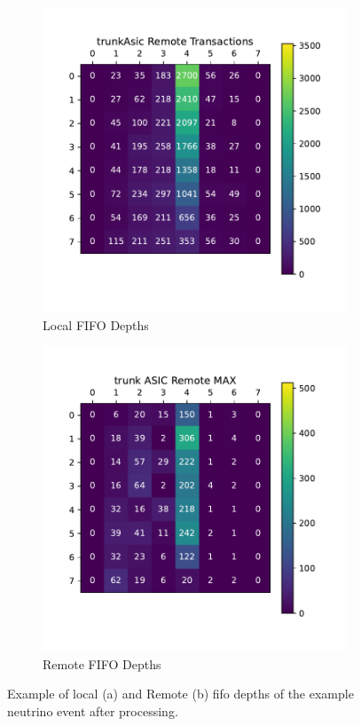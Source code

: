 \begin{figure}
\centering
\begin{subfigure}{.5\textwidth}
  \centering
  \includegraphics[width=\textwidth]{images/trunk_asic_trans.pdf}
  \caption{Local FIFO Depths}
\end{subfigure}%
\begin{subfigure}{.5\textwidth}
  \centering
  \includegraphics[width=\textwidth]{images/trunk_asic_remote.pdf}
  \caption{Remote FIFO Depths}
\end{subfigure}
\caption{Example of local (a) and Remote (b) fifo depths of the example neutrino event after processing.}
\label{fig:trunk_example_neutrino}
\end{figure}

